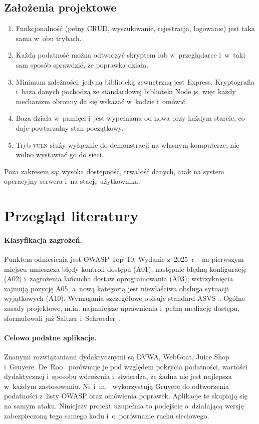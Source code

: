 \documentclass[12pt,a4paper]{article}
\newcommand{\vuln}{\textsc{vuln}}
\begin{document}
\subsection{Założenia projektowe}
\begin{enumerate}
\item Funkcjonalność (pełny CRUD, wyszukiwanie, rejestracja, logowanie) jest taka sama w~obu trybach.
\item Każdą podatność można odtworzyć skryptem lub w~przeglądarce i~w~taki sam sposób sprawdzić, że poprawka działa.
\item Minimum zależności: jedyną biblioteką zewnętrzną jest Express. Kryptografia i~baza danych pochodzą ze standardowej biblioteki Node.js, więc każdy mechanizm obronny da się wskazać w~kodzie i~omówić.
\item Baza działa w~pamięci i~jest wypełniana od nowa przy każdym starcie, co daje powtarzalny stan początkowy.
\item Tryb \vuln{} służy wyłącznie do demonstracji na własnym komputerze; nie wolno wystawiać go do sieci.
\end{enumerate}
Poza zakresem są: wysoka dostępność, trwałość danych, atak na system operacyjny serwera i~na stację użytkownika.

\section{Przegląd literatury}

\paragraph{Klasyfikacja zagrożeń.} Punktem odniesienia jest OWASP Top~10. Wydanie z~2025~r.~\cite{owasptop10} na pierwszym miejscu umieszcza błędy kontroli dostępu (A01), następnie błędną konfigurację (A02) i~zagrożenia łańcucha dostaw oprogramowania (A03); wstrzyknięcia zajmują pozycję A05, a~nową kategorią jest niewłaściwa obsługa sytuacji wyjątkowych (A10). Wymagania szczegółowe opisuje standard ASVS~\cite{asvs}. Ogólne zasady projektowe, m.in. najmniejsze uprawnienia i~pełną mediację dostępu, sformułowali już Saltzer i~Schroeder~\cite{saltzer}.

\paragraph{Celowo podatne aplikacje.} Znanymi rozwiązaniami dydaktycznymi są DVWA, WebGoat, Juice Shop i~Gruyere. De~Roo~\cite{deroo} porównuje je pod względem pokrycia podatności, wartości dydaktycznej i~sposobu wdrożenia i~stwierdza, że żadna nie jest najlepsza w~każdym zastosowaniu. Ni~i~in.~\cite{gruyere} wykorzystują Gruyere do odtworzenia podatności z~listy OWASP oraz omówienia poprawek. Aplikacje te skupiają się na samym ataku. Niniejszy projekt uzupełnia to podejście o~działającą wersję zabezpieczoną tego samego kodu i~o~porównanie ruchu sieciowego.
\end{document}
